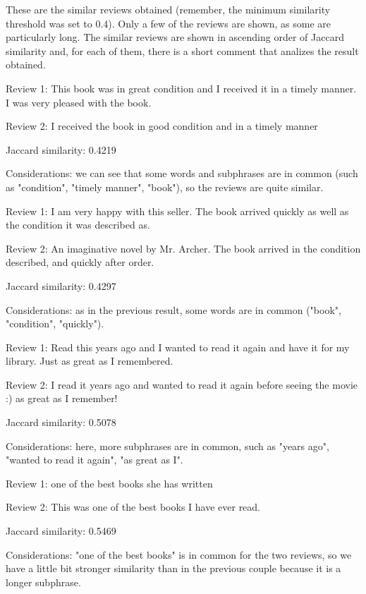 \documentclass[12pt, a4paper[]{article}
\begin{document}
These are the similar reviews obtained (remember, the minimum similarity threshold was set to 0.4). Only a few of the reviews are shown, as some are particularly long. The similar reviews are shown in ascending order of Jaccard similarity and, for each of them, there is a short comment that analizes the result obtained.

\begin{itemize}
    {\fontsize{9pt}{11pt}\selectfont
    \item Review 1: This book was in great condition and I received it in a timely manner. I was very pleased with the book.
    \item Review 2: I received the book in good condition and in a timely manner
    \item Jaccard similarity: 0.4219
    \item Considerations: we can see that some words and subphrases are in common (such as "condition", "timely manner", "book"), so the reviews are quite similar.
    } 
\end{itemize}
\dotfill
\begin{itemize}
    {\fontsize{9pt}{11pt}\selectfont
    \item Review 1: I am very happy with this seller. The book arrived quickly as well as the condition it was described as.
    \item Review 2: An imaginative novel by Mr. Archer. The book arrived in the condition described, and quickly after order.
    \item Jaccard similarity: 0.4297
    \item Considerations: as in the previous result, some words are in common ("book", "condition", "quickly").
    }
\end{itemize}
\dotfill
\begin{itemize}
    {\fontsize{9pt}{11pt}\selectfont
    \item Review 1: Read this years ago and I wanted to read it again and have it for my library. Just as great as I remembered.
    \item Review 2: I read it years ago and wanted to read it again before seeing the movie :) as great as I remember!
    \item Jaccard similarity: 0.5078
    \item Considerations: here, more subphrases are in common, such as "years ago", "wanted to read it again", "as great as I". 
    }
\end{itemize}
\dotfill
\begin{itemize}
    {\fontsize{9pt}{11pt}\selectfont
    \item Review 1: one of the best books she has written
    \item Review 2: This was one of the best books I have ever read.
    \item Jaccard similarity: 0.5469
    \item Considerations: "one of the best books" is in common for the two reviews, so we have a little bit stronger similarity than in the previous couple because it is a longer subphrase. 
    }
\end{itemize}
\end{document}

